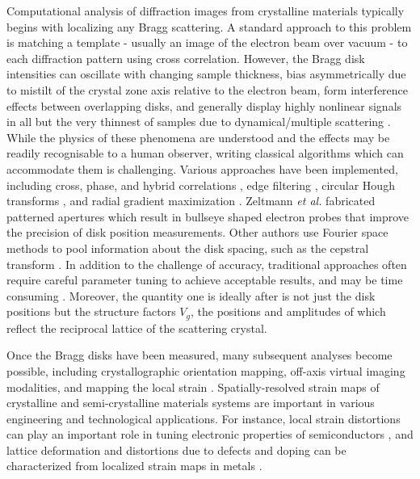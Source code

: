 \documentclass[%
 reprint,
superscriptaddress,
 amsmath,
 amssymb,
 prl,
]{revtex4-2}
\begin{document}
Computational analysis of diffraction images from crystalline materials typically begins with localizing any Bragg scattering. A standard approach to this problem is matching a template - usually an image of the electron beam over vacuum - to each diffraction pattern using cross correlation. However, the Bragg disk intensities can oscillate with changing sample thickness, bias asymmetrically due to mistilt of the crystal zone axis relative to the electron beam, form interference effects between overlapping disks, and generally display highly nonlinear signals in all but the very thinnest of samples due to dynamical/multiple scattering \cite{mahr2015theoretical, williamson2015quantitative, grieb2018strain, zeltmann2020patterned}. While the physics of these phenomena are understood and the effects may be readily recognisable to a human observer, writing classical algorithms which can accommodate them is challenging.  Various approaches have been implemented, including cross, phase, and hybrid correlations \citep{pekin2017optimizing}, edge filtering \citep{mukherjee2020lattice}, circular Hough transforms \citep{YUAN2019112837}, and radial gradient maximization \citep{muller2012scanning}.  Zeltmann \textit{et al.} fabricated patterned apertures which result in bullseye shaped electron probes that improve the precision of disk position \citep{zeltmann2020patterned} measurements.  Other authors use Fourier space methods to pool information about the disk spacing, such as the cepstral transform \cite{padgett2020exit}. In addition to the challenge of accuracy, traditional approaches often require careful parameter tuning to achieve acceptable results, and may be time consuming \cite{maclaren2021comparing}.  Moreover, the quantity one is ideally after is not just the disk positions but the structure factors $V_g$, the positions and amplitudes of which reflect the reciprocal lattice of the scattering crystal.

Once the Bragg disks have been measured, many subsequent analyses become possible, including crystallographic orientation mapping, off-axis virtual imaging modalities, and mapping the local strain \cite{seyring2011advance, shukla2016study, pekin2017optimizing, ophus2019four}. Spatially-resolved strain maps of crystalline and semi-crystalline materials systems are important in various engineering and technological applications. For instance, local strain distortions can play an important role in tuning electronic properties of semiconductors \citep{bedell2014strain, chidambaram2006fundamentals}, and lattice deformation and distortions due to defects and doping can be characterized from localized strain maps in metals \citep{wang2012sample, zhang2013strain, chen2021bending}.
\end{document}
